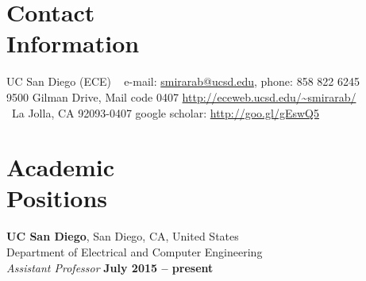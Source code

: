 \documentclass[margin,line,letterpaper]{resume}
\begin{document}
\begin{resume}

    \section{\mysidestyle Contact\\Information}
UC San Diego (ECE)  ~ \hfill e-mail: \url{smirarab@ucsd.edu},	phone: 858 822 6245   \vspace{0mm}\\\vspace{0mm} 
   9500 Gilman Drive, Mail code 0407  \hfill  \url{http://eceweb.ucsd.edu/~smirarab/}\vspace{0mm}\\\vspace{-4.5mm}%
   ~La Jolla, CA 92093-0407   	\hfill google scholar: \url{http://goo.gl/gEswQ5} \vspace{0mm}\\\vspace{-4.5mm}
   
      
    \section{\mysidestyle Academic\\Positions}

    \textbf{UC San Diego}, San Diego, CA, United States\\
    Department of Electrical and Computer Engineering\vspace{1mm}\\\vspace{0mm}%
    \textsl{Assistant Professor} \hfill \textbf{ July 2015 -- present}\vspace{-3mm}\\\vspace{-4mm}%

\end{resume}
\end{document}
